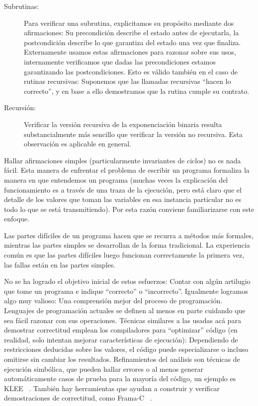 \begin{description}
  \item[Subrutinas:]
    Para verificar una subrutina,
    explicitamos su propósito mediante dos afirmaciones:
    Su precondición describe el estado antes de ejecutarla,
    la postcondición describe lo que garantiza del estado
    una vez que finaliza.
    Externamente
    usamos estas afirmaciones para razonar sobre sus usos,
    internamente verificamos que dadas las precondiciones
    estamos garantizando las postcondiciones.
    Esto es válido también en el caso de rutinas recursivas:
    Suponemos que las llamadas recursivas
    ``hacen lo correcto'',
    y en base a ello demostramos que la rutina cumple su contrato.
  \item[Recursión:]
    Verificar la versión recursiva de la exponenciación binaria
    resulta substancialmente más sencillo
    que verificar la versión no recursiva.
    Esta observación es aplicable en general.
  \end{description}
  Hallar afirmaciones simples
  (particularmente invariantes de ciclos)%
  no es nada fácil.
  Esta manera de enfrentar el problema de escribir un programa
  formaliza la manera en que entendemos un programa
  (muchas veces la explicación del funcionamiento
   es a través de una traza de la ejecución,
   pero está claro
   que el detalle de los valores que toman las variables
   en esa instancia particular
   no es todo lo que se está transmitiendo).
  Por esta razón conviene familiarizarse con este enfoque.

  Las partes difíciles de un programa
  hacen que se recurra a métodos más formales,
  mientras las partes simples
  se desarrollan de la forma tradicional.
  La experiencia común es que las partes difíciles
  luego funcionan correctamente la primera vez,
  las fallas están en las partes simples.

  No se ha logrado el objetivo inicial de estos esfuerzos:
  Contar con algún artilugio que tome un programa
  e indique ``correcto'' o ``incorrecto''.
  Igualmente logramos algo muy valioso:
  Una comprensión mejor del proceso de programación.
  Lenguajes de programación actuales se definen al menos en parte
  cuidando que sea fácil razonar con sus operaciones.
  Técnicas similares a las usadas acá para demostrar correctitud
  emplean los compiladores para ``optimizar'' código
  (en realidad, solo intentan mejorar características de ejecución):
  Dependiendo de restricciones deducidas sobre los valores,
  el código puede especializarse o incluso omitirse
  sin cambiar los resultados.
  Refinamientos del análisis son técnicas de ejecución simbólica,%
  que pueden hallar errores
  o al menos generar automáticamente casos de prueba%
  para la mayoría del código,
  un ejemplo es KLEE~%
    \cite{cadar08:_klee}.%
  También hay herramientas que ayudan a construir y verificar
  demostraciones de correctitud,
  como Frama-C~%
    \cite{cuoq12:_frama_c_softw_analy_persp}.%

